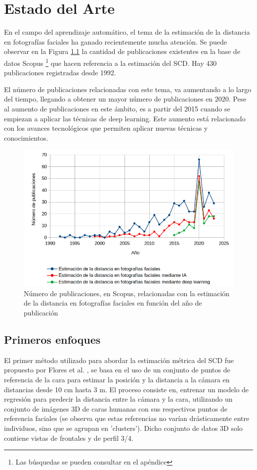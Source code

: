 \chapter{Estado del Arte}
\thispagestyle{empty}

En el campo del aprendizaje automático, el tema de la estimación de la distancia en fotografías faciales ha ganado recientemente mucha atención. Se puede observar en la Figura \ref{fig5} la cantidad de publicaciones existentes en la base de datos Scopus \footnote{Las búsquedas se pueden consultar en el apéndice} que hacen referencia a la estimación del SCD. Hay 430 publicaciones registradas desde 1992.

El número de publicaciones relacionadas con este tema, va aumentando a lo largo del tiempo, llegando a obtener un mayor número de publicaciones en 2020. Pese al aumento de publicaciones en este ámbito, es a partir del 2015 cuando se empiezan a aplicar las técnicas de deep learning. Este aumento está relacionado con los avances tecnológicos que permiten aplicar nuevas técnicas y conocimientos. 

\begin{figure}[h]
	\centering
	\includegraphics[scale=0.45]{imagenes/cap3/grafica_scopus3.png}
	\caption{Número de publicaciones, en Scopus, relacionadas con la estimación de la distancia en fotografías faciales en función del año de publicación}
	\label{fig5}
\end{figure}

\section{Primeros enfoques}

El primer método utilizado para abordar la estimación métrica del SCD fue propuesto por Flores et al. \cite{28}, se basa en el uso de un conjunto de puntos de referencia de la cara para estimar la posición y la distancia a la cámara en distancias desde 10 cm hasta 3 m. El proceso consiste en, entrenar un modelo de regresión para predecir la distancia entre la cámara y la cara, utilizando un conjunto de imágenes 3D de caras humanas con sus respectivos puntos de referencia faciales (se observa que estas referencias no varían drásticamente entre individuos, sino que se agrupan en 'clusters'). Dicho conjunto de datos 3D solo contiene vistas de frontales y de perfil 3/4. 

